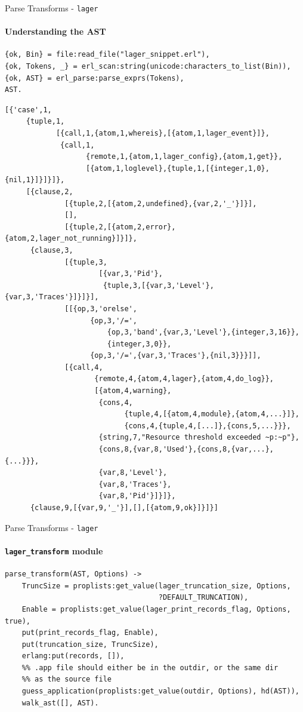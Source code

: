 \documentclass[c]{beamer}
\begin{document}
\begin{frame}[fragile]{Parse Transforms - \texttt{lager}}
  \framesubtitle{Understanding the AST}
  \begin{lstlisting}
{ok, Bin} = file:read_file("lager_snippet.erl"),
{ok, Tokens, _} = erl_scan:string(unicode:characters_to_list(Bin)),
{ok, AST} = erl_parse:parse_exprs(Tokens),
AST.
  \end{lstlisting}
  \pause
  \begin{lstlisting}[basicstyle=\color{solarizedRebase0}\ttfamily]
[{'case',1,
     {tuple,1,
            [{call,1,{atom,1,whereis},[{atom,1,lager_event}]},
             {call,1,
                   {remote,1,{atom,1,lager_config},{atom,1,get}},
                   [{atom,1,loglevel},{tuple,1,[{integer,1,0},{nil,1}]}]}]},
     [{clause,2,
              [{tuple,2,[{atom,2,undefined},{var,2,'_'}]}],
              [],
              [{tuple,2,[{atom,2,error},{atom,2,lager_not_running}]}]},
      {clause,3,
              [{tuple,3,
                      [{var,3,'Pid'},
                       {tuple,3,[{var,3,'Level'},{var,3,'Traces'}]}]}],
              [[{op,3,'orelse',
                    {op,3,'/=',
                        {op,3,'band',{var,3,'Level'},{integer,3,16}},
                        {integer,3,0}},
                    {op,3,'/=',{var,3,'Traces'},{nil,3}}}]],
              [{call,4,
                     {remote,4,{atom,4,lager},{atom,4,do_log}},
                     [{atom,4,warning},
                      {cons,4,
                            {tuple,4,[{atom,4,module},{atom,4,...}]},
                            {cons,4,{tuple,4,[...]},{cons,5,...}}},
                      {string,7,"Resource threshold exceeded ~p:~p"},
                      {cons,8,{var,8,'Used'},{cons,8,{var,...},{...}}},
                      {var,8,'Level'},
                      {var,8,'Traces'},
                      {var,8,'Pid'}]}]},
      {clause,9,[{var,9,'_'}],[],[{atom,9,ok}]}]}]
  \end{lstlisting}
\end{frame}

\begin{frame}[fragile]{Parse Transforms - \texttt{lager}}
  \framesubtitle{\texttt{lager\_transform} module}
\begin{lstlisting}[emph={walk_ast,AST}]
parse_transform(AST, Options) ->
    TruncSize = proplists:get_value(lager_truncation_size, Options,
                                    ?DEFAULT_TRUNCATION),
    Enable = proplists:get_value(lager_print_records_flag, Options, true),
    put(print_records_flag, Enable),
    put(truncation_size, TruncSize),
    erlang:put(records, []),
    %% .app file should either be in the outdir, or the same dir
    %% as the source file
    guess_application(proplists:get_value(outdir, Options), hd(AST)),
    walk_ast([], AST).
\end{lstlisting}
\end{frame}
\end{document}
